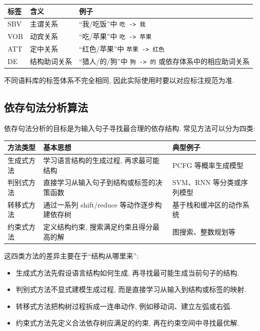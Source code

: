\begin{table}[H]
\centering
\begingroup
\setlength{\tabcolsep}{2pt}
\small
\begin{tabular}{|p{}|p{}|p{}|}
\hline
标签 & 含义 & 例子 \\ \hline
SBV & 主谓关系 & “我/吃饭”中 \texttt{吃 -\textgreater{} 我} \\ \hline
VOB & 动宾关系 & “吃/苹果”中 \texttt{吃 -\textgreater{} 苹果} \\ \hline
ATT & 定中关系 & “红色/苹果”中 \texttt{苹果 -\textgreater{} 红色} \\ \hline
DE & 结构助词关系 & “猎人/的/狗”中 \texttt{狗 -\textgreater{} 的} 或依存体系中的相应助词关系 \\ \hline
\end{tabular}
\endgroup
\end{table}

不同语料库的标签体系不完全相同, 因此实际使用时要以对应标注规范为准.

\subsection{依存句法分析算法}


依存句法分析的目标是为输入句子寻找最合理的依存结构.
常见方法可以分为四类:

\begin{table}[H]
\centering
\begingroup
\setlength{\tabcolsep}{2pt}
\small
\begin{tabular}{|p{}|p{}|p{}|}
\hline
方法类型 & 基本思想 & 典型例子 \\ \hline
生成式方法 & 学习语言结构的生成过程, 再求最可能结构 & PCFG 等概率生成模型 \\ \hline
判别式方法 & 直接学习从输入句子到结构或标签的决策函数 & SVM、RNN 等分类或序列模型 \\ \hline
转移式方法 & 通过一系列 shift/reduce 等动作逐步构建依存树 & 基于栈和缓冲区的动作系统 \\ \hline
约束式方法 & 定义结构约束, 搜索满足约束且得分最高的解 & 图搜索、整数规划等 \\ \hline
\end{tabular}
\endgroup
\end{table}

这四类方法的差异主要在于“结构从哪里来”:

\begin{itemize}
\item 生成式方法先假设语言结构如何生成, 再寻找最可能生成当前句子的结构.
\item 判别式方法不显式建模生成过程, 而是直接学习从输入到结构或标签的映射.
\item 转移式方法把构树过程拆成一连串动作, 例如移动词、建立左弧或右弧.
\item 约束式方法先定义合法依存树应满足的约束, 再在约束空间中寻找最优解.
\end{itemize}

